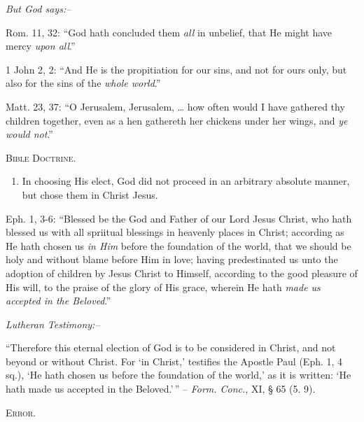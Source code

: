 \documentclass[
]{book}
\providecommand{\tightlist}{%
  \setlength{\itemsep}{0pt}\setlength{\parskip}{0pt}}
\begin{document}
\begin{center}
\textsl{But God says:--}
\end{center}

Rom. 11, 32: ``God hath concluded them \emph{all} in unbelief, that He might have mercy \emph{upon all}.''

1 John 2, 2: ``And He is the propitiation for our sins, and not for ours only, but also for the sins of the \emph{whole world}.''

Matt. 23, 37: ``O Jerusalem, Jerusalem, \ldots{} how often would I have gathered thy children together, even as a hen gathereth her chickens under her wings, and \emph{ye would not}.''

\begin{center}
\textsc{Bible Doctrine.}
\end{center}

\begin{enumerate}
\def\labelenumi{\alph{enumi}.}
\setcounter{enumi}{1}
\tightlist
\item
  In choosing His elect, God did not proceed in an arbitrary absolute manner, but chose them in Christ Jesus.
\end{enumerate}

Eph. 1, 3-6: ``Blessed be the God and Father of our Lord Jesus Christ, who hath blessed us with all spriitual blessings in heavenly places in Christ; according as He hath chosen us \emph{in Him} before the foundation of the world, that we should be holy and without blame before Him in love; having predestinated us unto the adoption of children by Jesus Christ to Himself, according to the good pleasure of His will, to the praise of the glory of His grace, wherein He hath \emph{made us accepted in the Beloved}.''

\begin{center}
\textsl{Lutheran Testimony:--}
\end{center}

``Therefore this eternal election of God is to be considered in Christ, and not beyond or without Christ. For `in Christ,' testifies the Apostle Paul (Eph. 1, 4 sq.), `He hath chosen us before the foundation of the world,' as it is written: `He hath made us accepted in the Beloved.'\,'' -- \emph{Form. Conc.}, XI, § 65 (5. 9).

\begin{center}
\textsc{Error.}
\end{center}
\end{document}
